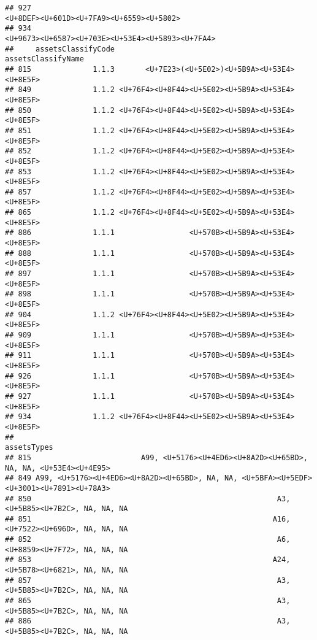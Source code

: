 \documentclass[
]{article}
\begin{document}
\begin{verbatim}
## 927                                                                                     <U+8DEF><U+601D><U+7FA9><U+6559><U+5802>
## 934                                                                             <U+9673><U+6587><U+703E><U+53E4><U+5893><U+7FA4>
##     assetsClassifyCode                               assetsClassifyName
## 815              1.1.3       <U+7E23>(<U+5E02>)<U+5B9A><U+53E4><U+8E5F>
## 849              1.1.2 <U+76F4><U+8F44><U+5E02><U+5B9A><U+53E4><U+8E5F>
## 850              1.1.2 <U+76F4><U+8F44><U+5E02><U+5B9A><U+53E4><U+8E5F>
## 851              1.1.2 <U+76F4><U+8F44><U+5E02><U+5B9A><U+53E4><U+8E5F>
## 852              1.1.2 <U+76F4><U+8F44><U+5E02><U+5B9A><U+53E4><U+8E5F>
## 853              1.1.2 <U+76F4><U+8F44><U+5E02><U+5B9A><U+53E4><U+8E5F>
## 857              1.1.2 <U+76F4><U+8F44><U+5E02><U+5B9A><U+53E4><U+8E5F>
## 865              1.1.2 <U+76F4><U+8F44><U+5E02><U+5B9A><U+53E4><U+8E5F>
## 886              1.1.1                 <U+570B><U+5B9A><U+53E4><U+8E5F>
## 888              1.1.1                 <U+570B><U+5B9A><U+53E4><U+8E5F>
## 897              1.1.1                 <U+570B><U+5B9A><U+53E4><U+8E5F>
## 898              1.1.1                 <U+570B><U+5B9A><U+53E4><U+8E5F>
## 904              1.1.2 <U+76F4><U+8F44><U+5E02><U+5B9A><U+53E4><U+8E5F>
## 909              1.1.1                 <U+570B><U+5B9A><U+53E4><U+8E5F>
## 911              1.1.1                 <U+570B><U+5B9A><U+53E4><U+8E5F>
## 926              1.1.1                 <U+570B><U+5B9A><U+53E4><U+8E5F>
## 927              1.1.1                 <U+570B><U+5B9A><U+53E4><U+8E5F>
## 934              1.1.2 <U+76F4><U+8F44><U+5E02><U+5B9A><U+53E4><U+8E5F>
##                                                                                 assetsTypes
## 815                         A99, <U+5176><U+4ED6><U+8A2D><U+65BD>, NA, NA, <U+53E4><U+4E95>
## 849 A99, <U+5176><U+4ED6><U+8A2D><U+65BD>, NA, NA, <U+5BFA><U+5EDF><U+3001><U+7891><U+78A3>
## 850                                                        A3, <U+5B85><U+7B2C>, NA, NA, NA
## 851                                                       A16, <U+7522><U+696D>, NA, NA, NA
## 852                                                        A6, <U+8859><U+7F72>, NA, NA, NA
## 853                                                       A24, <U+5B78><U+6821>, NA, NA, NA
## 857                                                        A3, <U+5B85><U+7B2C>, NA, NA, NA
## 865                                                        A3, <U+5B85><U+7B2C>, NA, NA, NA
## 886                                                        A3, <U+5B85><U+7B2C>, NA, NA, NA

\end{verbatim}
\end{document}
